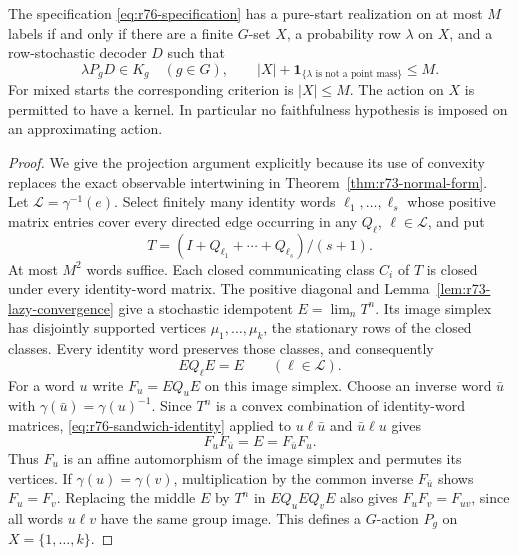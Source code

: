 \begin{theorem}
\label{thm:r76-convex-normal-form}
The specification \eqref{eq:r76-specification} has a pure-start
realization on at most $M$ labels if and only if there are a finite
$G$-set $X$, a probability row $\lambda$ on $X$, and a row-stochastic
decoder $D$ such that
\begin{equation}\label{eq:r76-convex-core}
 \lambda P_gD\in K_g\quad(g\in G),\qquad
 |X|+\mathbf1_{\{\lambda\text{ is not a point mass}\}}\le M.
\end{equation}
For mixed starts the corresponding criterion is $|X|\le M$.
The action on $X$ is permitted to have a kernel. In particular no
faithfulness hypothesis is imposed on an approximating action.
\end{theorem}
\begin{proof}
We give the projection argument explicitly because its use of convexity
replaces the exact observable intertwining in
Theorem~\ref{thm:r73-normal-form}.
Let $\mathcal L=\gamma^{-1}(e)$. Select finitely many identity words
$\ell_1,\ldots,\ell_s$ whose positive matrix entries cover every
directed edge occurring in any $Q_\ell$, $\ell\in\mathcal L$, and put
\[
 T=(I+Q_{\ell_1}+\cdots+Q_{\ell_s})/(s+1).
\]
At most $M^2$ words suffice. Each closed communicating class $C_i$ of
$T$ is closed under every identity-word matrix. The positive diagonal
and Lemma~\ref{lem:r73-lazy-convergence} give a stochastic idempotent
$E=\lim_nT^n$. Its image simplex has disjointly supported vertices
$\mu_1,\ldots,\mu_k$, the stationary rows of the closed classes.
Every identity word preserves those classes, and consequently
\begin{equation}\label{eq:r76-sandwich-identity}
 EQ_\ell E=E\qquad(\ell\in\mathcal L).
\end{equation}
For a word $u$ write $F_u=EQ_uE$ on this image simplex. Choose an
inverse word $\bar u$ with $\gamma(\bar u)=\gamma(u)^{-1}$.
Since $T^n$ is a convex combination of identity-word matrices,
\eqref{eq:r76-sandwich-identity} applied to $u\ell\bar u$ and
$\bar u\ell u$ gives
\[
 F_uF_{\bar u}=E=F_{\bar u}F_u.
\]
Thus $F_u$ is an affine automorphism of the image simplex and permutes
its vertices. If $\gamma(u)=\gamma(v)$, multiplication by the common
inverse $F_{\bar u}$ shows $F_u=F_v$. Replacing the middle $E$ by
$T^n$ in $EQ_uEQ_vE$ also gives $F_uF_v=F_{uv}$, since all words
$u\ell v$ have the same group image. This defines a $G$-action $P_g$
on $X=\{1,\ldots,k\}$.


\end{proof}
